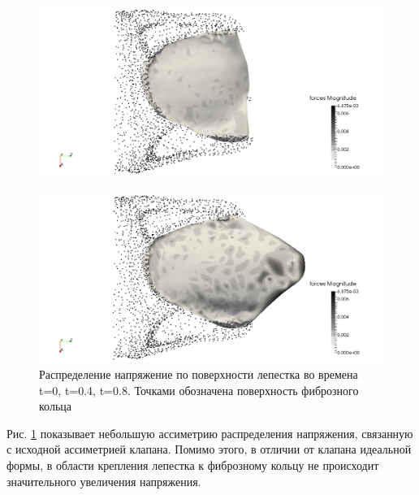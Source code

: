 \begin{figure}[htbp]
\centering
\includegraphics{uniline_stress_2.png}
\caption{}
\end{figure}

\begin{figure}[htbp]
\centering
\includegraphics{uniline_stress_3.png}
\caption{\label{fig:uniline_stress}Распределение напряжение по
поверхности лепестка во времена t=0, t=0.4, t=0.8. Точками обозначена
поверхность фиброзного кольца}
\end{figure}

Рис. \ref{fig:uniline_stress} показывает небольшую ассиметрию
распределения напряжения, связанную с исходной ассиметрией клапана.
Помимо этого, в отличии от клапана идеальной формы, в области крепления
лепестка к фиброзному кольцу не происходит значительного увеличения
напряжения.

